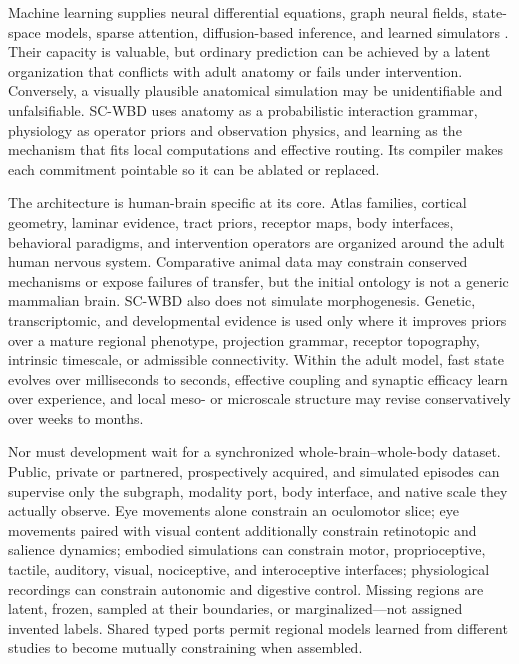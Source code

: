 Machine learning supplies neural differential equations, graph neural fields,
state-space models, sparse attention, diffusion-based inference, and learned
simulators \citep{aqil2021,kashyap2023}. Their capacity is valuable, but
ordinary prediction can be achieved by a latent organization that conflicts
with adult anatomy or fails under intervention. Conversely, a visually
plausible anatomical simulation may be unidentifiable and unfalsifiable.
SC-WBD uses anatomy as a probabilistic interaction grammar, physiology as
operator priors and observation physics, and learning as the mechanism that
fits local computations and effective routing. Its compiler makes each
commitment pointable so it can be ablated or replaced.

The architecture is human-brain specific at its core. Atlas families,
cortical geometry, laminar evidence, tract priors, receptor maps, body
interfaces, behavioral paradigms, and intervention operators are organized
around the adult human nervous system. Comparative animal data may constrain
conserved mechanisms or expose failures of transfer, but the initial ontology
is not a generic mammalian brain. SC-WBD also does not simulate
morphogenesis. Genetic, transcriptomic, and developmental evidence is used
only where it improves priors over a mature regional phenotype, projection
grammar, receptor topography, intrinsic timescale, or admissible connectivity.
Within the adult model, fast state evolves over milliseconds to seconds,
effective coupling and synaptic efficacy learn over experience, and local
meso- or microscale structure may revise conservatively over weeks to months.

Nor must development wait for a synchronized whole-brain--whole-body dataset.
Public, private or partnered, prospectively acquired, and simulated episodes
can supervise only the subgraph, modality port, body interface, and native
scale they actually observe. Eye movements alone constrain an oculomotor
slice; eye movements paired with visual content additionally constrain
retinotopic and salience dynamics; embodied simulations can constrain motor,
proprioceptive, tactile, auditory, visual, nociceptive, and interoceptive
interfaces; physiological recordings can constrain autonomic and digestive
control. Missing regions are latent, frozen, sampled at their boundaries, or
marginalized---not assigned invented labels. Shared typed ports permit
regional models learned from different studies to become mutually
constraining when assembled.

